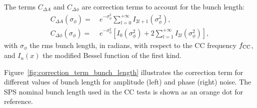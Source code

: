 The terms $C_{\Delta A}$ and $C_{\Delta \phi}$ are correction terms to account for the bunch length:
\begin{align}
C_{\Delta A}(\sigma_{\phi}) = ~& e^{-\sigma_{\phi}^2}\sum_{l=0}^{+\infty} I_{2l+1}(\sigma_{\phi}^2),\\
C_{\Delta \phi}(\sigma_{\phi}) = ~& e^{-\sigma_{\phi}^2} \left[I_0(\sigma_{\phi}^2) + 2 \sum_{l=1}^{+\infty} I_{2l}(\sigma_{\phi}^2) \right],
\end{align}
with $\sigma_{\phi}$ the rms bunch length, in radians, with respect to the CC frequency ${f_\mathrm{CC}}$, and $I_n(x)$ the modified Bessel function of the first kind. 

Figure~\ref{fig:correction_term_bunch_length} illustrates the correction term for different values of bunch length for amplitude (left) and phase (right) noise. The SPS nominal bunch length used in the CC tests is shown as an orange dot for reference.

